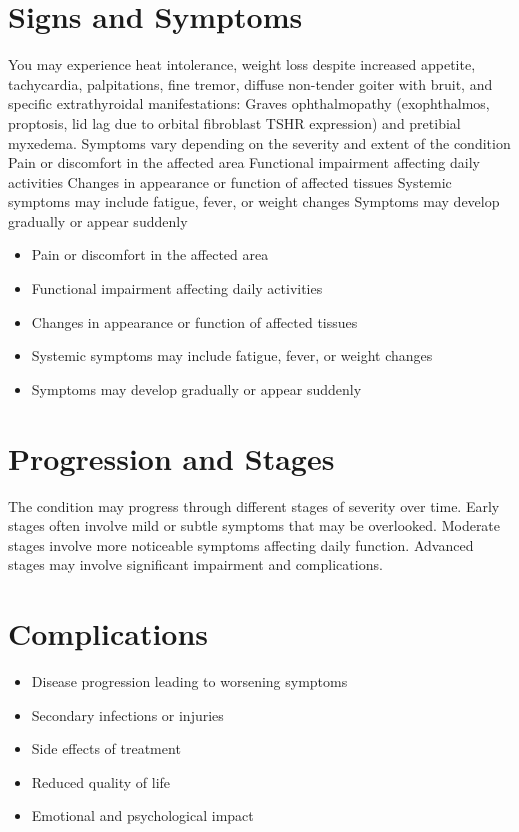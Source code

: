 \section{Signs and Symptoms}
You may experience heat intolerance, weight loss despite increased appetite, tachycardia, palpitations, fine tremor, diffuse non-tender goiter with bruit, and specific extrathyroidal manifestations: Graves ophthalmopathy (exophthalmos, proptosis, lid lag due to orbital fibroblast TSHR expression) and pretibial myxedema. Symptoms vary depending on the severity and extent of the condition Pain or discomfort in the affected area Functional impairment affecting daily activities Changes in appearance or function of affected tissues Systemic symptoms may include fatigue, fever, or weight changes Symptoms may develop gradually or appear suddenly

\begin{itemize}[noitemsep]
  \item Pain or discomfort in the affected area
  \item Functional impairment affecting daily activities
  \item Changes in appearance or function of affected tissues
  \item Systemic symptoms may include fatigue, fever, or weight changes
  \item Symptoms may develop gradually or appear suddenly
\end{itemize}
\section{Progression and Stages}
The condition may progress through different stages of severity over time. Early stages often involve mild or subtle symptoms that may be overlooked. Moderate stages involve more noticeable symptoms affecting daily function. Advanced stages may involve significant impairment and complications.
\section{Complications}
\begin{itemize}[noitemsep]
  \item Disease progression leading to worsening symptoms
  \item Secondary infections or injuries
  \item Side effects of treatment
  \item Reduced quality of life
  \item Emotional and psychological impact
\end{itemize}
